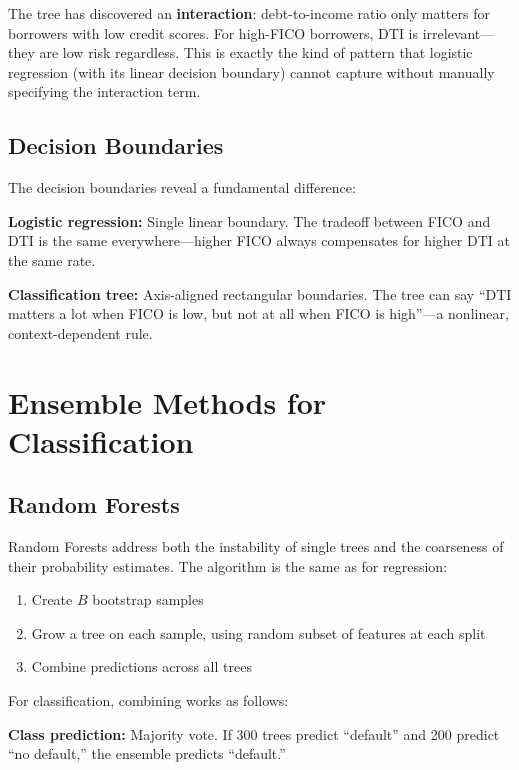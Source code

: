 \documentclass[11pt,a4paper]{article}
\newcommand{\keyword}[1]{\textbf{\textcolor{AccentOrange}{#1}}}
\begin{document}
The tree has discovered an \keyword{interaction}: debt-to-income ratio only matters for borrowers with low credit scores. For high-FICO borrowers, DTI is irrelevant---they are low risk regardless. This is exactly the kind of pattern that logistic regression (with its linear decision boundary) cannot capture without manually specifying the interaction term.

\subsection{Decision Boundaries}

The decision boundaries reveal a fundamental difference:

\textbf{Logistic regression:} Single linear boundary. The tradeoff between FICO and DTI is the same everywhere---higher FICO always compensates for higher DTI at the same rate.

\textbf{Classification tree:} Axis-aligned rectangular boundaries. The tree can say ``DTI matters a lot when FICO is low, but not at all when FICO is high''---a nonlinear, context-dependent rule.

\section{Ensemble Methods for Classification}

\subsection{Random Forests}

Random Forests address both the instability of single trees and the coarseness of their probability estimates. The algorithm is the same as for regression:
\begin{enumerate}
    \item Create $B$ bootstrap samples
    \item Grow a tree on each sample, using random subset of features at each split
    \item Combine predictions across all trees
\end{enumerate}

For classification, combining works as follows:

\textbf{Class prediction:} Majority vote. If 300 trees predict ``default'' and 200 predict ``no default,'' the ensemble predicts ``default.''
\end{document}
